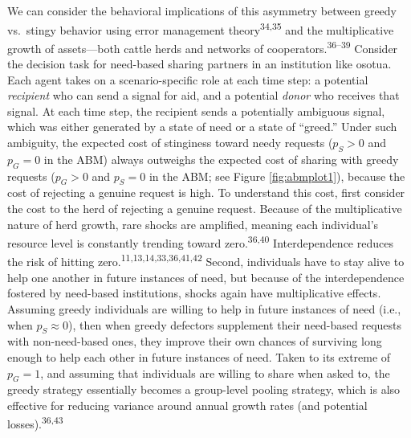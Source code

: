 \documentclass[
]{article}
\begin{document}
We can consider the behavioral implications of this asymmetry between greedy vs.~stingy behavior using error management theory\textsuperscript{34,35} and the multiplicative growth of assets---both cattle herds and networks of cooperators.\textsuperscript{36--39} Consider the decision task for need-based sharing partners in an institution like osotua. Each agent takes on a scenario-specific role at each time step: a potential \emph{recipient} who can send a signal for aid, and a potential \emph{donor} who receives that signal. At each time step, the recipient sends a potentially ambiguous signal, which was either generated by a state of need or a state of ``greed.'' Under such ambiguity, the expected cost of stinginess toward needy requests (\(p_S >0\) and \(p_G=0\) in the ABM) always outweighs the expected cost of sharing with greedy requests (\(p_G>0\) and \(p_S=0\) in the ABM; see Figure \ref{fig:abmplot1}), because the cost of rejecting a genuine request is high. To understand this cost, first consider the cost to the herd of rejecting a genuine request. Because of the multiplicative nature of herd growth, rare shocks are amplified, meaning each individual's resource level is constantly trending toward zero.\textsuperscript{36,40} Interdependence reduces the risk of hitting zero.\textsuperscript{11,13,14,33,36,41,42} Second, individuals have to stay alive to help one another in future instances of need, but because of the interdependence fostered by need-based institutions, shocks again have multiplicative effects. Assuming greedy individuals are willing to help in future instances of need (i.e., when \(p_S \approx 0\)), then when greedy defectors supplement their need-based requests with non-need-based ones, they improve their own chances of surviving long enough to help each other in future instances of need. Taken to its extreme of \(p_G=1\), and assuming that individuals are willing to share when asked to, the greedy strategy essentially becomes a group-level pooling strategy, which is also effective for reducing variance around annual growth rates (and potential losses).\textsuperscript{36,43}
\end{document}
